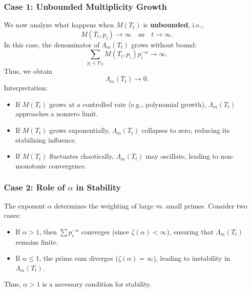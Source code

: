 \documentclass[12pt]{article}
\begin{document}
\subsubsection{Case 1: Unbounded Multiplicity Growth}
We now analyze what happens when \( M(T_t) \) is \textbf{unbounded}, i.e.,
\begin{equation}
    M(T_t, p_i) \to \infty \quad \text{as} \quad t \to \infty.
\end{equation}
In this case, the denominator of \( \Lambda_m(T_t) \) grows without bound:
\begin{equation}
    \sum_{p_i \in P_N} M(T_t, p_i) p_i^{-\alpha} \to \infty.
\end{equation}
Thus, we obtain
\begin{equation}
    \Lambda_m(T_t) \to 0.
\end{equation}
Interpretation:
\begin{itemize}
    \item If \( M(T_t) \) grows at a controlled rate (e.g., polynomial growth), \( \Lambda_m(T_t) \) approaches a nonzero limit.
    \item If \( M(T_t) \) grows exponentially, \( \Lambda_m(T_t) \) collapses to zero, reducing its stabilizing influence.
    \item If \( M(T_t) \) fluctuates chaotically, \( \Lambda_m(T_t) \) may oscillate, leading to non-monotonic convergence.
\end{itemize}

\subsubsection{Case 2: Role of \( \alpha \) in Stability}
The exponent \( \alpha \) determines the weighting of large vs. small primes. Consider two cases:
\begin{itemize}
    \item If \( \alpha > 1 \), then \( \sum p_i^{-\alpha} \) converges (since \( \zeta(\alpha) < \infty \)), ensuring that \( \Lambda_m(T_t) \) remains finite.
    \item If \( \alpha \leq 1 \), the prime sum diverges (\( \zeta(\alpha) = \infty \)), leading to instability in \( \Lambda_m(T_t) \).
\end{itemize}
Thus, \( \alpha > 1 \) is a necessary condition for stability.
\end{document}
